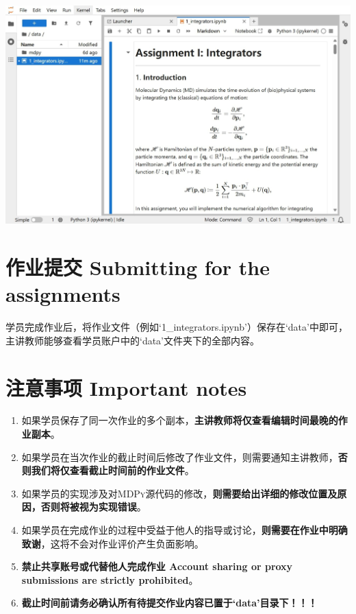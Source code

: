 \documentclass{article}
\begin{document}
\centerline{\includegraphics[scale=0.8]{figs/system1.jpg}}

\section*{作业提交 Submitting for the assignments}

学员完成作业后，将作业文件（例如`1\_integrators.ipynb'）保存在`data'中即可，主讲教师能够查看学员账户中的`data'文件夹下的全部内容。

\section*{注意事项 Important notes}

\begin{enumerate}
  \item 如果学员保存了同一次作业的多个副本，\textbf{主讲教师将仅查看编辑时间最晚的作业副本}。
  \item 如果学员在当次作业的截止时间后修改了作业文件，则需要通知主讲教师，\textbf{否则我们将仅查看截止时间前的作业文件}。
  \item 如果学员的实现涉及对\textsc{MDPy}源代码的修改，\textbf{则需要给出详细的修改位置及原因，否则将被视为实现错误}。
  \item 如果学员在完成作业的过程中受益于他人的指导或讨论，\textbf{则需要在作业中明确致谢}，这将不会对作业评价产生负面影响。
  \item \textbf{禁止共享账号或代替他人完成作业 Account sharing or proxy submissions are strictly prohibited}。
  \item {\bf \color{myred} 截止时间前请务必确认所有待提交作业内容已置于`data'目录下！！！}
\end{enumerate}
\end{document}
